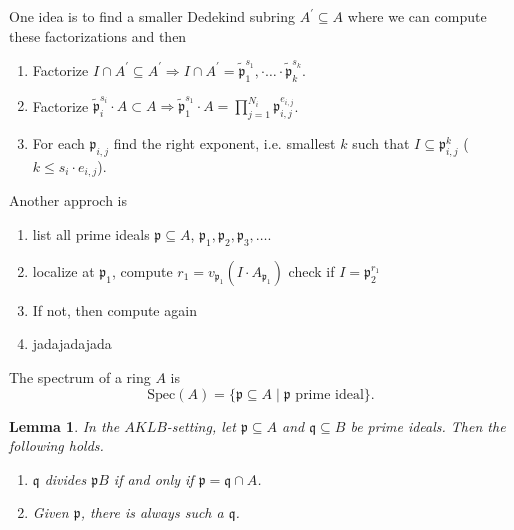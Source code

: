 \documentclass[a4paper]{book}
\theoremstyle{break}
\theoremstyle{plain}
\newtheorem{lemma}{Lemma}[definition]
\begin{document}
One idea is to find a smaller Dedekind subring \(A^\prime \subseteq A\) where we can compute these factorizations and then

\begin{enumerate}
    \item Factorize \(I \cap A^\prime \subseteq A^\prime \Rightarrow I \cap A^\prime = \tilde{\mathfrak{p}}_1^{s_1}, \cdot \ldots \cdot \tilde{\mathfrak{p}}_k^{s_k}\).
    \item Factorize \(\tilde{\mathfrak{p}}_i^{s_i} \cdot A \subset A \Rightarrow \tilde{\mathfrak{p}}_1^{s_1} \cdot A = \prod_{j=1}^{N_i} \mathfrak{p}_{i, j}^{e_{i, j}}\).
    \item For each \(\mathfrak{p}_{i, j}\) find the right exponent, i.e. smallest \(k\) such that \(I \subseteq \mathfrak{p}_{i, j}^k\) (\(k \leq s_i \cdot e_{i, j}\)).
\end{enumerate}

Another approch is

\begin{enumerate}
    \item list all prime ideals \(\mathfrak{p} \subseteq A\), \(\mathfrak{p}_1, \mathfrak{p}_2, \mathfrak{p}_3, \ldots\).
    \item localize at \(\mathfrak{p}_1\), compute \(r_1 = v_{\mathfrak{p}_1} (I \cdot A_{\mathfrak{p}_1})\) check if \(I = \mathfrak{p}_2^{r_1}\)
    \item If not, then compute again
    \item jadajadajada
\end{enumerate}

\begin{definition}
    The spectrum of a ring \(A\) is
    \begin{equation}
        \text{Spec}(A) = \{\mathfrak{p} \subseteq A \mid \mathfrak{p} \text{ prime ideal}\}.
    \end{equation}
\end{definition}

\begin{lemma}
    In the \(AKLB\)-setting, let \(\mathfrak{p} \subseteq A\) and \(\mathfrak{q} \subseteq B\) be prime ideals. Then the following holds.
    \begin{enumerate}
        \item \(\mathfrak{q}\) divides \(\mathfrak{p}B\) if and only if \(\mathfrak{p} = \mathfrak{q} \cap A\).
        \item Given \(\mathfrak{p}\), there is always such a \(\mathfrak{q}\).
    \end{enumerate}
\end{lemma}
\end{document}
